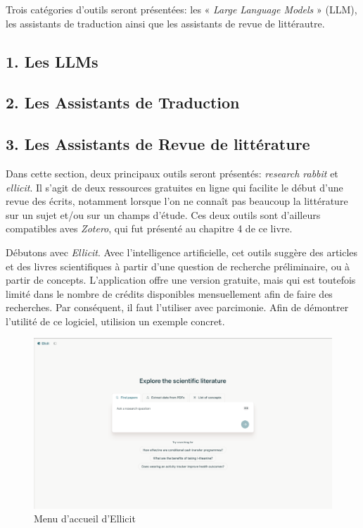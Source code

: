 \documentclass[
  letterpaper,
]{scrbook}
\begin{document}
Trois catégories d'outils seront présentées: les « \emph{Large Language
Models} » (LLM), les assistants de traduction ainsi que les assistants
de revue de littérautre.

\hypertarget{les-llms}{%
\subsection{1. Les LLMs}\label{les-llms}}

\hypertarget{les-assistants-de-traduction}{%
\subsection{2. Les Assistants de
Traduction}\label{les-assistants-de-traduction}}

\hypertarget{les-assistants-de-revue-de-littuxe9rature}{%
\subsection{3. Les Assistants de Revue de
littérature}\label{les-assistants-de-revue-de-littuxe9rature}}

Dans cette section, deux principaux outils seront présentés:
\emph{research rabbit} et \emph{ellicit}. Il s'agit de deux ressources
gratuites en ligne qui facilite le début d'une revue des écrits,
notamment lorsque l'on ne connaît pas beaucoup la littérature sur un
sujet et/ou sur un champs d'étude. Ces deux outils sont d'ailleurs
compatibles aves \emph{Zotero}, qui fut présenté au chapitre 4 de ce
livre.

Débutons avec \emph{Ellicit}. Avec l'intelligence artificielle, cet
outils suggère des articles et des livres scientifiques à partir d'une
question de recherche préliminaire, ou à partir de concepts.
L'application offre une version gratuite, mais qui est toutefois limité
dans le nombre de crédits disponibles mensuellement afin de faire des
recherches. Par conséquent, il faut l'utiliser avec parcimonie. Afin de
démontrer l'utilité de ce logiciel, utilision un exemple concret.

\begin{figure}

{\centering \includegraphics{images/chapitre9_image2.png}

}

\caption{\label{fig-ellicit}Menu d'accueil d'Ellicit}

\end{figure}
\end{document}

